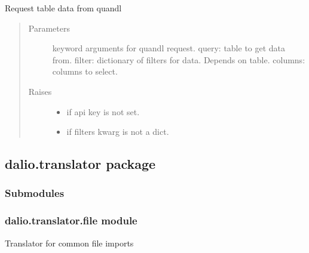 \documentclass[letterpaper,10pt,english]{sphinxmanual}
\begin{document}
\begin{fulllineitems}

\begin{fulllineitems}
\label{\detokenize{dalio.external:dalio.external.QuandlAPI.request}}
Request table data from quandl
\begin{quote}\begin{description}
\item[{Parameters}] \leavevmode
{} \textendash{} keyword arguments for quandl request.
query: table to get data from.
filter: dictionary of filters for data. Depends on table.
columns: columns to select.

\item[{Raises}] \leavevmode\begin{itemize}
\item {} 
 \textendash{} if api key is not set.

\item {} 
 \textendash{} if filters kwarg is not a dict.

\end{itemize}

\end{description}\end{quote}

\end{fulllineitems}


\end{fulllineitems}



\subsection{dalio.translator package}
\label{\detokenize{dalio.translator:dalio-translator-package}}\label{\detokenize{dalio.translator::doc}}

\subsubsection{Submodules}
\label{\detokenize{dalio.translator:submodules}}

\subsubsection{dalio.translator.file module}
\label{\detokenize{dalio.translator:module-dalio.translator.file}}\label{\detokenize{dalio.translator:dalio-translator-file-module}}
Translator for common file imports
\end{document}
